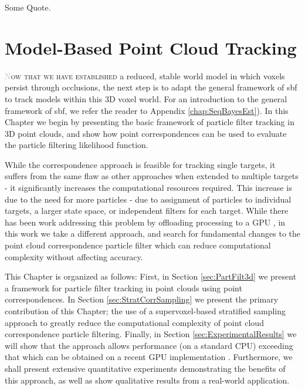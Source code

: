 \begin{savequote}[75mm]
Some Quote.
\end{savequote}

\chapter{Model-Based Point Cloud Tracking}
\label{Chap:ModelBasedTracking}
\lettrine[lines=3, loversize=0.3]{\textcolor{Silver}N}{ow that we have established} a reduced, stable world model in which voxels persist through occlusions, the next step is to adapt the general framework of \gls{sbf} to track models within this 3D voxel world. For an introduction to the general framework of \gls{sbf}, we refer the reader to Appendix \ref{chap:SeqBayesEst}). In this Chapter we begin by presenting the basic framework of particle filter tracking in 3D point clouds, and show how point correspondences can be used to evaluate the particle filtering likelihood function.

While the correspondence approach is feasible for tracking single targets, it suffers from the same flaw as other approaches when extended to multiple targets \cite{MCMCPartFilt_05, ApproxMultiTrack_06,Koo_IROS2013, Breitenstein_ICCV2009} - it significantly increases the computational resources required. This increase is due to the need for more particles - due to assignment of particles to individual targets, a larger state space, or independent filters for each target. While there has been work addressing this problem by offloading processing to a GPU \cite{Choi_IROS2013}, in this work we take a different approach, and search for fundamental changes to the point cloud correspondence particle filter which can reduce computational complexity without affecting accuracy. 

This Chapter is organized as follows: First, in Section \ref{sec:PartFilt3d} we present a framework for particle filter tracking in point clouds using point correspondences. In Section \ref{sec:StratCorrSampling} we present the primary contribution of this Chapter; the use of a supervoxel-based stratified sampling approach to greatly reduce the computational complexity of point cloud correspondence particle filtering. Finally, in Section \ref{sec:ExperimentalResults} we will show that the approach allows performance (on a standard CPU) exceeding that which can be obtained on a recent GPU implementation \cite{Choi_IROS2013}. Furthermore, we shall present extensive quantitative experiments demonstrating the benefits of this approach, as well as show qualitative results from a real-world application. 

